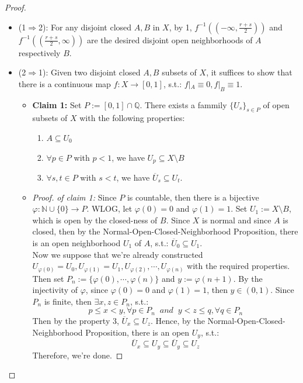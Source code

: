 \begin{proof}
    \begin{itemize}
        \item (1$\Rightarrow$2): For any disjoint closed $A,B$ in $X$, by 1, $f^{-1}((-\infty, \frac{r+s}{2}))$ and $f^{-1}((\frac{r+s}{2},\infty))$ are the desired disjoint open neighborhoods of $A$ respectively $B$.
        \item (2$\Rightarrow$1): Given two disjoint closed $A,B$ subsets of $X$, it suffices to show that there is a continuous map $f:X \to [0,1]$, s.t.: $f|_A\equiv 0,f|_B \equiv 1$.
        \begin{itemize}
            \item \textbf{Claim 1:} Set $P:= [0,1] \cap \mathbb{Q}$. There exists a fammily $\{U_s\}_{s \in P}$ of open subsets of $X$ with the following properties:
            \begin{enumerate}
                \item $A \subseteq U_0$
                \item $\forall p\in P$ with $p<1$, we have $U_p \subseteq X \setminus B$
                \item $\forall s,t\in P$ with $s<t$, we have $\overline{U}_s \subseteq U_t$.
            \end{enumerate}

            \item \begin{proof}
                \textit{of claim 1:} Since $P$ is countable, then there is a bijective $\varphi: \mathbb{N} \cup \{0\} \to P$. WLOG, let $\varphi(0)=0$ and $\varphi (1)=1$. Set $U_1:= X\setminus B$, which is open by the closed-ness of $B$. Since $X$ is normal and since $A$ is closed, then by the Normal-Open-Closed-Neighborhood Proposition, there is an open neighborhood $U_1$ of $A$, s.t.: $\overline{U}_0 \subseteq U_1$.\\
                Now we suppose that we're already constructed $U_{\varphi(0)}= U_0, U_{\varphi(1)}= U_1 ,U_{\varphi(2)} ,\cdots, U_{\varphi(n)}$ with the required properties. Then set $P_n:= \{ \varphi(0) ,\cdots, \varphi (n)\}$ and $y:= \varphi(n+1)$. By the injectivity of $\varphi$, since $\varphi(0)=0$ and $\varphi(1)=1$, then $y \in (0,1)$. Since $P_n$ is finite, then $\exists x,z \in P_n$, s.t.:
                $$p\leq x<y,\forall p\in P_n \;\;and\;\; y< z\leq q ,\forall q\in P_n$$
                Then by the property 3, $\overline{U}_x \subseteq U_z$. Hence, by the Normal-Open-Closed-Neighborhood Proposition, there is an open $U_y$, s.t.:
                $$\overline{U}_x \subseteq U_y \subseteq \overline{U}_y \subseteq U_z$$
                Therefore, we're done.
            \end{proof}
        \end{itemize}


\end{itemize}
\end{proof}
